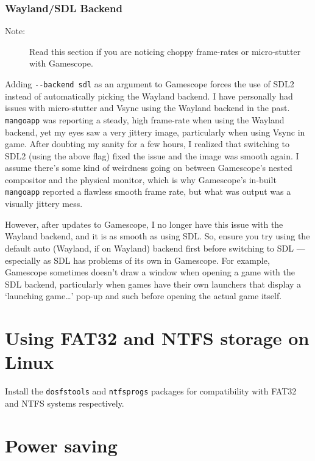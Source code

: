 \documentclass[a4paper]{article}
\begin{document}
\subsubsection{Wayland/SDL Backend}

\begin{description}
    \item[Note:] Read this section if you are noticing choppy frame-rates or micro-stutter with Gamescope.
\end{description}

Adding \lstinline|--backend sdl| as an argument to Gamescope forces the use of SDL2 instead of automatically picking the Wayland backend.
I have personally had issues with micro-stutter and Vsync using the Wayland backend in the past.
\lstinline|mangoapp| was reporting a steady, high frame-rate when using the Wayland backend, yet my eyes saw a very jittery image, particularly when using Vsync in game.
After doubting my sanity for a few hours, I realized that switching to SDL2 (using the above flag) fixed the issue and the image was smooth again.
I assume there's some kind of weirdness going on between Gamescope's nested compositor and the physical monitor, which is why Gamescope's in-built \lstinline|mangoapp| reported a flawless smooth frame rate, but what was output was a visually jittery mess.

However, after updates to Gamescope, I no longer have this issue with the Wayland backend, and it is as smooth as using SDL.
So, ensure you try using the default auto (Wayland, if on Wayland) backend first before switching to SDL --- especially as SDL has problems of its own in Gamescope.
For example, Gamescope sometimes doesn't draw a window when opening a game with the SDL backend, particularly when games have their own launchers that display a `launching game…' pop-up and such before opening the actual game itself.


\section{Using FAT32 and NTFS storage on Linux}

Install the \lstinline|dosfstools| and \lstinline|ntfsprogs| packages for compatibility with FAT32 and NTFS systems respectively.


\section{Power saving}
\end{document}

